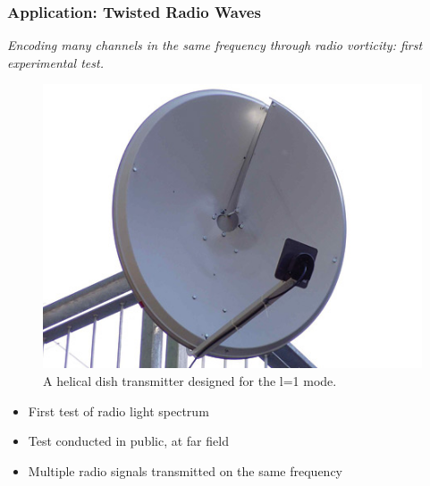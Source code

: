 \documentclass[xcolor=dvipsnames]{beamer}
\newenvironment{items}[1][]
{\begin{itemize}
    \ifthenelse{\isempty{#1}}
    {\setlength{\itemsep}{12pt}}{\setlength{\itemsep}{#1}}}
  {\end{itemize}}
\begin{document}
\begin{frame}
	\frametitle{Application: Twisted Radio Waves}
	\begin{center}
		\emph{Encoding many channels in the same frequency through radio vorticity: first experimental test.}
	\end{center}
	\begin{minipage}{0.49\textwidth}
		\begin{figure}
		\includegraphics[width=\textwidth]{helical_dish}
		\caption{A helical dish transmitter designed for the l=1 mode.}
		\label{pic:dish}
		\end{figure}
	\end{minipage}
	\begin{minipage}{0.49\textwidth}
		\begin{items}
		\item First test of radio light spectrum
		\item Test conducted in public, at far field
		\item Multiple radio signals transmitted on the same frequency
		\end{items}
	\end{minipage}
\end{frame}
\end{document}

